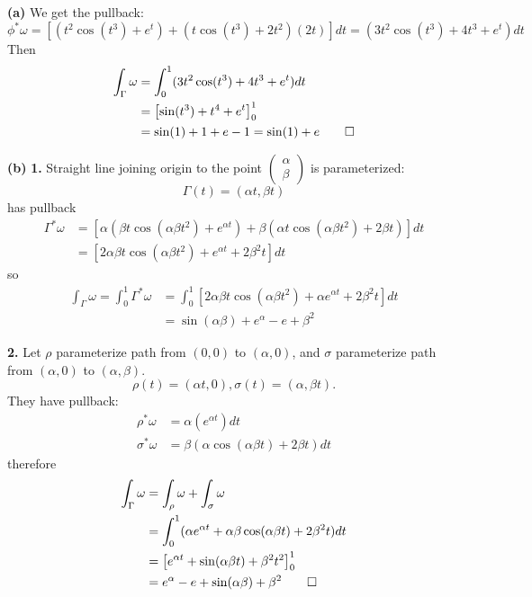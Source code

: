 \documentclass[a4paper, 12pt]{article}
\begin{document}
\begin{solution}
    \textbf{(a)} We get the pullback: \[
    \phi^* \omega = [(t^2 \cos (t^3) + e^t) + (t \cos (t^3) + 2t^2)(2t)]dt = (3t^2 \cos (t^3) + 4t^3 + e^t) dt
    \]
    Then \begin{align*}
    \int_{\Gamma} \omega &= \int_{0}^{1} (3t^2 \cos (t^3) + 4t^3 + e^t) dt \\
    &= \left[\sin(t^3) + t^4 + e^t\right]_0^1 \\
    &= \sin(1) + 1 + e - 1 = \sin(1) + e \qed
    \end{align*}

    \textbf{(b)} 
    \textbf{1.} Straight line joining origin to the point $\begin{pmatrix}
        \alpha \\
        \beta 
    \end{pmatrix}$
    is parameterized: \[
        \Gamma(t) = (\alpha t, \beta t)
    \]
    has pullback
    \begin{align*}
        \Gamma^* \omega &= [\alpha(\beta t \cos(\alpha \beta t^2) + e^{\alpha t}) + \beta(\alpha t \cos (\alpha \beta t^2) + 2 \beta t)] dt \\
        &= [2\alpha \beta t \cos (\alpha \beta t^2) + e^{\alpha t} + 2 \beta^2 t] dt
    \end{align*}
    so \begin{align*}
    \int_{\Gamma} \omega = \int_{0}^{1} \Gamma^* \omega &= \int_{0}^{1} [2\alpha \beta t \cos (\alpha \beta t^2) + \alpha e^{\alpha t} + 2 \beta^2 t] dt \\
    &= \sin(\alpha \beta) + e^\alpha - e + \beta^2
    \end{align*}

    \textbf{2.} Let $\rho$ parameterize path from $(0, 0)$ to $(\alpha, 0)$, and $\sigma$ parameterize path from $(\alpha, 0)$ to $(\alpha, \beta)$.
    \[
        \rho(t) = (\alpha t, 0), \sigma(t) = (\alpha, \beta t).
    \]
    They have pullback: \begin{align*}
    \rho^* \omega &= \alpha(e^{\alpha t}) dt \\
    \sigma^* \omega &= \beta (\alpha \cos(\alpha \beta t) + 2 \beta t) dt
    \end{align*}
    therefore \begin{align*}
    \int_{\Gamma} \omega &= \int_{\rho} \omega + \int_{\sigma} \omega \\
    &= \int_{0}^{1} (\alpha e^{\alpha t} + \alpha \beta \cos(\alpha \beta t) + 2\beta^2 t) dt \\
    &= \left[e^{\alpha t} + \sin(\alpha \beta t) + \beta^2 t^2\right]_0^1 \\
    &= e^\alpha - e + \sin(\alpha \beta) + \beta^2 \qed
    \end{align*}


\end{solution}
\end{document}
